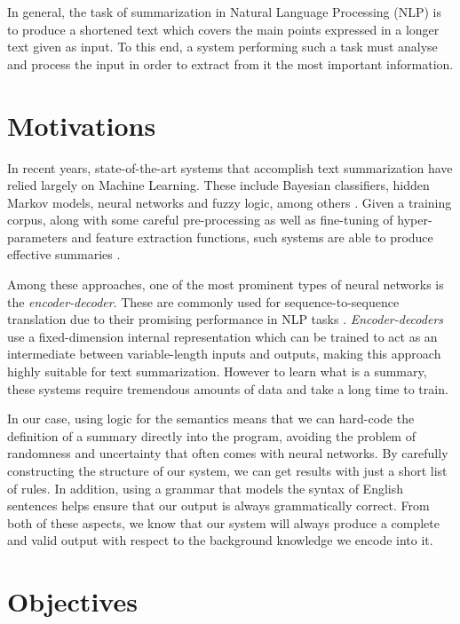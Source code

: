 \label{chapter:introduction}

In general, the task of summarization in Natural Language Processing (NLP) is to produce a shortened text which covers the main points expressed in a longer text given as input. To this end, a system performing such a task must analyse and process the input in order to extract from it the most important information.

\section{Motivations}

In recent years, state-of-the-art systems that accomplish text summarization have relied largely on Machine Learning. These include Bayesian classifiers, hidden Markov models, neural networks and fuzzy logic, among others \cite{kiyani_survey_2017}. Given a training corpus, along with some careful pre-processing as well as fine-tuning of hyper-parameters and feature extraction functions, such systems are able to produce effective summaries \cite{kiyani_survey_2017}.

Among these approaches, one of the most prominent types of neural networks is the \textit{encoder-decoder}. These are commonly used for sequence-to-sequence translation due to their promising performance in NLP tasks \cite{yao_dual_2018}. \textit{Encoder-decoders} use a fixed-dimension internal representation which can be trained to act as an intermediate between variable-length inputs and outputs, making this approach highly suitable for text summarization. However to learn what is a summary, these systems require tremendous amounts of data and take a long time to train.

In our case, using logic for the semantics means that we can hard-code the definition of a summary directly into the program, avoiding the problem of randomness and uncertainty that often comes with neural networks. By carefully constructing the structure of our system, we can get results with just a short list of rules. In addition, using a grammar that models the syntax of English sentences helps ensure that our output is always grammatically correct. From both of these aspects, we know that our system will always produce a complete and valid output with respect to the background knowledge we encode into it.

\section{Objectives}

